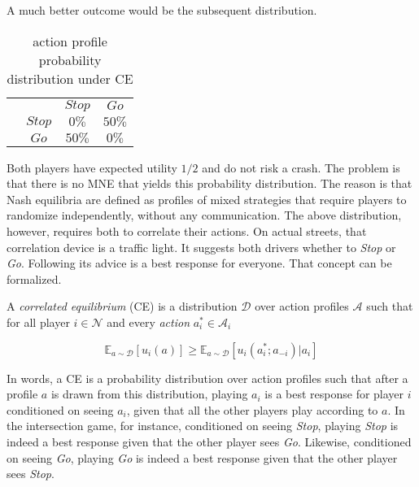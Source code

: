 A much better outcome would be the subsequent distribution.

\begin{table}[H]\centering
\setlength{\extrarowheight}{2pt}
\begin{tabular}{cc|c|c|}
  & \multicolumn{1}{c}{} & \multicolumn{1}{c}{$Stop$}  & \multicolumn{1}{c}{$Go$} \\\cline{3-4}
  & $Stop$ & $0\%$ & $50\%$ \\\cline{3-4}
  & $Go$ & $50\%$ & $0\%$ \\\cline{3-4}
\end{tabular}\caption{\label{tab:probabilityUnderCE}action profile probability distribution under CE}
\end{table}

Both players have expected utility $1/2$ and do not risk a crash. The problem is that there is no MNE that yields this probability distribution. The reason is that Nash equilibria are defined as profiles of mixed strategies that require players to randomize independently, without any
communication. The above distribution, however, requires both to correlate their actions. On actual streets, that correlation device is a traffic light. It suggests both drivers whether to \textit{Stop} or \textit{Go}. Following its advice is a best response for everyone. That concept can be formalized. 

\begin{definition}\label{def:CE}
    A \textit{correlated equilibrium} (CE) is a distribution $\mathcal{D}$ over action profiles $\mathcal{A}$ such that for all player $i \in \mathcal{N}$ and every \textit{action} $a_{i}^{*} \in \mathcal{A}_i$
    
    \[\mathbb{E}_{a \sim \mathcal{D}}[u_i(a)] \ge \mathbb{E}_{a \sim \mathcal{D}}[u_i(a_{i}^{*};a_{-i})|a_i]\]
\end{definition}

In words, a CE is a probability distribution over action profiles such that after a profile $a$ is drawn from this distribution, playing $a_i$ is a best response for player $i$ conditioned on seeing $a_i$, given that all the other players play according to $a$. In the intersection game, for instance, conditioned on seeing \textit{Stop}, playing \textit{Stop} is indeed a best response given that the other player sees \textit{Go}. Likewise, conditioned on seeing \textit{Go}, playing \textit{Go} is indeed a best response given that the other player sees \textit{Stop}. \\

